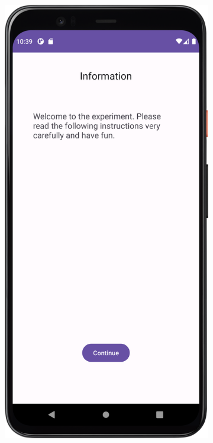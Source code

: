 \begin{figure}[htbp]
    \centering
    \begin{subfigure}[b]{0.25\textwidth}
        \centering
        \includegraphics[width=\textwidth]{content/07_evaluation_of_the_solution/Screenshot_StartingScreen.png}

\end{subfigure}
\end{figure}
